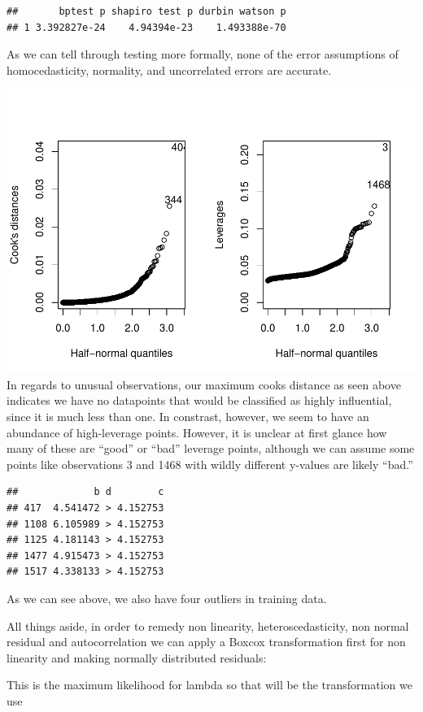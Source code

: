\documentclass[
]{article}
\begin{document}
\begin{verbatim}
##       bptest p shapiro test p durbin watson p
## 1 3.392827e-24    4.94394e-23    1.493388e-70
\end{verbatim}

As we can tell through testing more formally, none of the error
assumptions of homocedasticity, normality, and uncorrelated errors are
accurate.

\includegraphics{Final_Project_2_files/figure-latex/unnamed-chunk-11-1.pdf}
In regards to unusual observations, our maximum cooks distance as seen
above indicates we have no datapoints that would be classified as highly
influential, since it is much less than one. In constrast, however, we
seem to have an abundance of high-leverage points. However, it is
unclear at first glance how many of these are ``good'' or ``bad''
leverage points, although we can assume some points like observations 3
and 1468 with wildly different y-values are likely ``bad.''

\begin{verbatim}
##             b d        c
## 417  4.541472 > 4.152753
## 1108 6.105989 > 4.152753
## 1125 4.181143 > 4.152753
## 1477 4.915473 > 4.152753
## 1517 4.338133 > 4.152753
\end{verbatim}

As we can see above, we also have four outliers in training data.

All things aside, in order to remedy non linearity, heteroscedasticity,
non normal residual and autocorrelation we can apply a Boxcox
transformation first for non linearity and making normally distributed
residuals:

This is the maximum likelihood for lambda so that will be the
transformation we use
\end{document}

